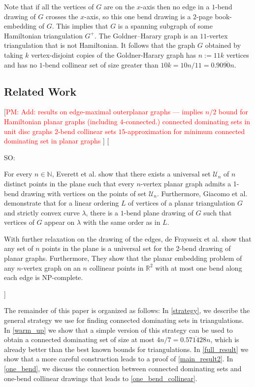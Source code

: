 \documentclass[12pt]{article}
\theoremstyle{definition}
\newcommand{\pat}[1]{[\textcolor{red}{PM: #1}]}
\newcommand{\saeed}[1]{[{\color{blue}SO: #1}]}
\begin{document}
Note that if all the vertices of $G$ are on the $x$-axis then no edge in a $1$-bend drawing of $G$ crosses the $x$-axis, so this one bend drawing is a $2$-page book-embedding of $G$. This implies that $G$ is a spanning subgraph of some Hamiltonian triangulation $G^+$.  The Goldner–Harary graph is an $11$-vertex triangulation that is not Hamiltonian. It follows that the graph $G$ obtained by taking $k$ vertex-disjoint copies of the Goldner-Harary graph has $n:=11k$ vertices and has no $1$-bend collinear set of size greater than $10k=10n/11=0.90\overline{90}n$.





\subsection{Related Work}

\pat{Add: \newline
results on edge-maximal outerplanar graphs --- implies $n/2$ bound for Hamiltonian planar graphs (including $4$-connected.) \newline
connected dominating sets in unit disc graphs \newline
$2$-bend collinear sets \newline
$15$-approximation for minimum connected dominating set in planar graphs \newline
}
\saeed{

For every $n \in \mathbb{N}$, Everett et al. \cite{DBLP:conf/gd/EverettLLW07} show that there exists a universal set $\mathcal{U}_n$ of $n$ distinct points in the plane such that every $n$-vertex planar graph admits a 1-bend drawing with vertices on the points of set $\mathcal{U}_n$. Furthermore, Giacomo et al. \cite{DBLP:journals/comgeo/GiacomoDLW05} demonstrate that for a linear ordering $L$ of vertices of a planar triangulation $G$ and strictly convex curve $\lambda$, there is a $1$-bend plane drawing of $G$ such that vertices of $G$ appear on $\lambda$ with the same order as in $L$.

With further relaxation on the drawing of the edges, de Fraysseix et al. \cite{DBLP:journals/combinatorica/FraysseixPP90} show that any set of $n$ points in the plane is a universal set for the 2-bend drawing of planar graphs. Furthermore, They show that the planar embedding problem of any $n$-vertex graph on an $n$ collinear points in $\mathbb{R}^2$ with at most one bend along each edge is NP-complete.
}

The remainder of this paper is organized as follows:  In \cref{strategy}, we describe the general strategy we use for finding connected dominating sets in triangulations.  In \cref{warm_up} we show that a simple version of this strategy can be used to obtain a connected dominating set of size at most $4n/7= 0.\overline{571428}n$, which is already better than the best known bounds for triangulations.  In \cref{full_result} we show that a more careful construction leads to a proof of \cref{main_result2}.  In \cref{one_bend}, we discuss the connection between connected dominating sets and one-bend collinear drawings that leads to \cref{one_bend_collinear}.
\end{document}
